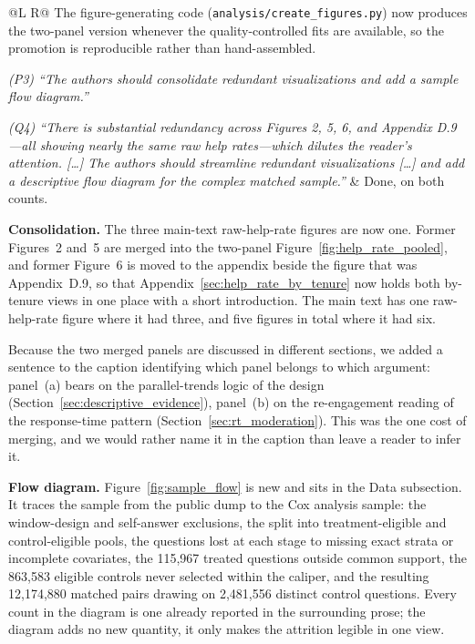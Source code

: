 \documentclass[11pt]{article}
\begin{document}
\begin{longtable}{@{}L R@{}}
The figure-generating code (\texttt{analysis/create\_figures.py}) now produces the two-panel version whenever the quality-controlled fits are available, so the promotion is reproducible rather than hand-assembled.\\
\midrule

\textit{(P3) ``The authors should consolidate redundant visualizations and add a sample flow diagram.''}

\textit{(Q4) ``There is substantial redundancy across Figures 2, 5, 6, and Appendix D.9---all showing nearly the same raw help rates---which dilutes the reader's attention. [\ldots] The authors should streamline redundant visualizations [\ldots] and add a descriptive flow diagram for the complex matched sample.''} &
Done, on both counts.

\textbf{Consolidation.} The three main-text raw-help-rate figures are now one. Former Figures~2 and~5 are merged into the two-panel Figure~\ref{fig:help_rate_pooled}, and former Figure~6 is moved to the appendix beside the figure that was Appendix~D.9, so that Appendix~\ref{sec:help_rate_by_tenure} now holds both by-tenure views in one place with a short introduction. The main text has one raw-help-rate figure where it had three, and five figures in total where it had six.

Because the two merged panels are discussed in different sections, we added a sentence to the caption identifying which panel belongs to which argument: panel~(a) bears on the parallel-trends logic of the design (Section~\ref{sec:descriptive_evidence}), panel~(b) on the re-engagement reading of the response-time pattern (Section~\ref{sec:rt_moderation}). This was the one cost of merging, and we would rather name it in the caption than leave a reader to infer it.

\textbf{Flow diagram.} Figure~\ref{fig:sample_flow} is new and sits in the Data subsection. It traces the sample from the public dump to the Cox analysis sample: the window-design and self-answer exclusions, the split into treatment-eligible and control-eligible pools, the questions lost at each stage to missing exact strata or incomplete covariates, the 115,967 treated questions outside common support, the 863,583 eligible controls never selected within the caliper, and the resulting 12,174,880 matched pairs drawing on 2,481,556 distinct control questions. Every count in the diagram is one already reported in the surrounding prose; the diagram adds no new quantity, it only makes the attrition legible in one view.\\
\midrule


\end{longtable}
\end{document}

